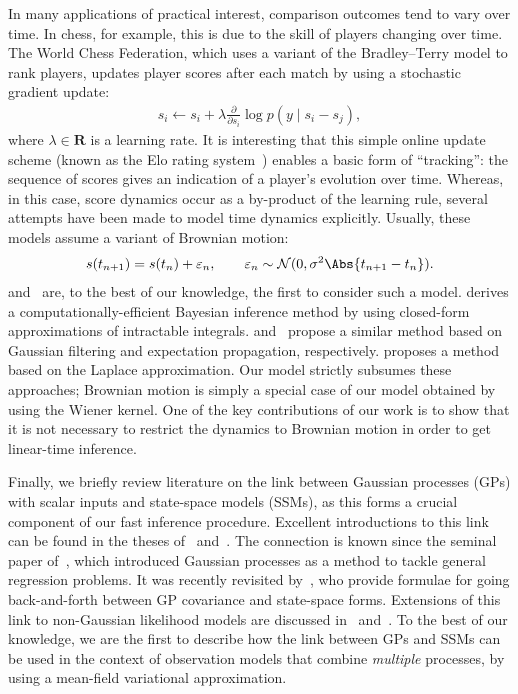 In many applications of practical interest, comparison outcomes tend to vary over time.
In chess, for example, this is due to the skill of players changing over time.
The World Chess Federation, which uses a variant of the Bradley--Terry model to rank players, updates player scores after each match by using a stochastic gradient update:
\begin{align*}
	s_i \gets s_i + \lambda \frac{\partial}{\partial s_i} \log p(y \mid s_i - s_j),
\end{align*}
where $\lambda \in \mathbf{R}$ is a learning rate.
It is interesting that this simple online update scheme (known as the Elo rating system~\citep{elo1978rating}) enables a basic form of ``tracking'': the sequence of scores gives an indication of a player's evolution over time.
Whereas, in this case, score dynamics occur as a by-product of the learning rule, several attempts have been made to model time dynamics explicitly.
Usually, these models assume a variant of Brownian motion:
\begin{align}
	\label{kks:eq:brownian}
	s(t_{n+1}) = s(t_n) + \varepsilon_{n},
	\qquad \varepsilon_{n} \sim \mathcal{N}(0, \sigma^2 \Abs{t_{n+1} - t_n}).
\end{align}
\citet{glickman1993paired} and~\citet{fahrmeir1994dynamic} are, to the best of our knowledge, the first to consider such a model.
\citet{glickman1999parameter} derives a computationally-efficient Bayesian inference method by using closed-form approximations of intractable integrals.
\citet{herbrich2006trueskill} and~\citet{dangauthier2007trueskill} propose a similar method based on Gaussian filtering and expectation propagation, respectively.
\citet{coulom2008whole} proposes a method based on the Laplace approximation.
Our model strictly subsumes these approaches; Brownian motion is simply a special case of our model obtained by using the Wiener kernel.
One of the key contributions of our work is to show that it is not necessary to restrict the dynamics to Brownian motion in order to get linear-time inference.

Finally, we briefly review literature on the link between Gaussian processes (GPs) with scalar inputs and state-space models (SSMs), as this forms a crucial component of our fast inference procedure.
Excellent introductions to this link can be found in the theses of~\citet{saatci2012scalable} and~\citet{solin2016stochastic}.
The connection is known since the seminal paper of~\citet{ohagan1978curve}, which introduced Gaussian processes as a method to tackle general regression problems.
It was recently revisited by~\citet{hartikainen2010kalman}, who provide formulae for going back-and-forth between GP covariance and state-space forms.
Extensions of this link to non-Gaussian likelihood models are discussed in~\citet{saatci2012scalable} and~\citet{nickisch2018state}.
To the best of our knowledge, we are the first to describe how the link between GPs and SSMs can be used in the context of observation models that combine \emph{multiple} processes, by using a mean-field variational approximation.
